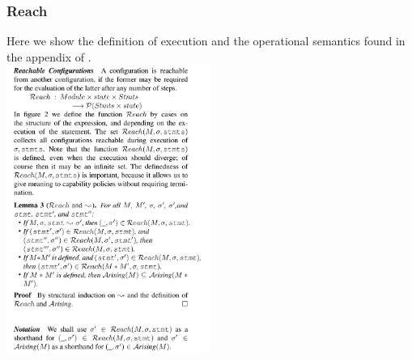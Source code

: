 \documentclass[a4paper,11pt,twoside]{article}
\begin{document}
{\subsubsection{Reach}\label{app:reach}
Here we show the definition of execution and the operational semantics found in the appendix of \cite{drossopoulou2015b}.\\

\includegraphics[trim={0 0 0 0},width=0.5\textwidth]{figures/app_reach.pdf}\linebreak
\clearpage

}
\end{document}
